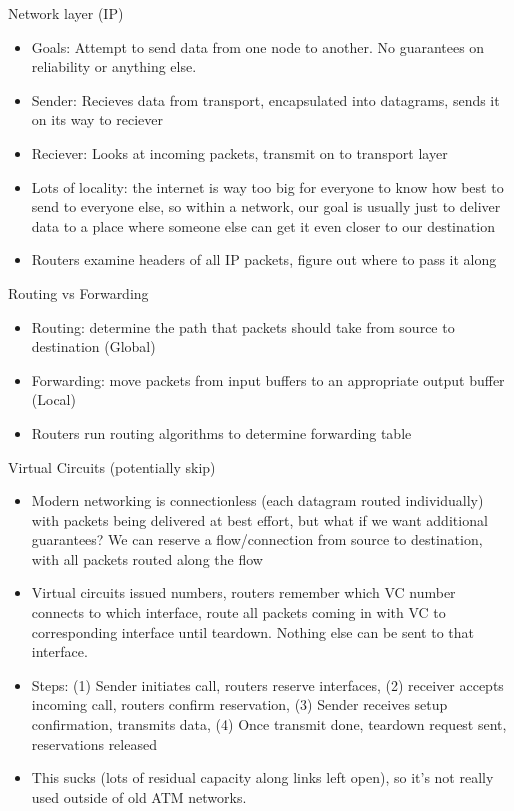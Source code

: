 \documentclass{beamer}
\begin{document}
\begin{frame}[t]{Network layer (IP)}
    \begin{itemize}
        \item \alert{Goals}: Attempt to send data from one node to another. No guarantees on reliability or anything else.
        \pause\item \alert{Sender}: Recieves data from transport, encapsulated into datagrams, sends it on its way to reciever
        \pause\item \alert{Reciever}: Looks at incoming packets, transmit on to transport layer
        \pause\item \alert{Lots of locality}: the internet is \alert{way} too big for everyone to know how best to send to everyone else, so within a network, our goal is usually just to deliver data to a place where someone else can get it even closer to our destination
        \pause\item Routers examine headers of all IP packets, figure out where to pass it along
    \end{itemize}
\end{frame}

\begin{frame}[t]{Routing vs Forwarding}
    \begin{itemize}
        \item \alert{Routing}: determine the path that packets should take from source to destination (Global)
        \pause\item \alert{Forwarding}: move packets from input buffers to an appropriate output buffer (Local)
        \pause\item Routers run routing algorithms to determine \alert{forwarding table}
    \end{itemize}
\end{frame}


\begin{frame}[t]{Virtual Circuits (potentially skip)}
    \begin{itemize}
        \item Modern networking is \alert{connectionless} (each datagram routed individually) with packets being delivered at \alert{best effort}, but what if we want additional guarantees? We can reserve a \alert{flow/connection} from source to destination, with all packets routed along the flow 
        \pause\item Virtual circuits issued numbers, routers remember which VC number connects to which interface, route all packets coming in with VC to corresponding interface until teardown. \alert{Nothing} else can be sent to that interface.
        \pause\item Steps: (1) Sender initiates call, routers reserve interfaces, (2) receiver accepts incoming call, routers confirm reservation, (3) Sender receives setup confirmation, transmits data, (4) Once transmit done, teardown request sent, reservations released
        \pause\item This sucks (\alert{lots} of residual capacity along links left open), so it's not really used outside of old ATM networks.
    \end{itemize}
\end{frame}
\end{document}
